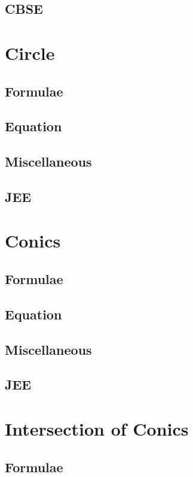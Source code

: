 \documentclass[journal]{IEEEtran}
\begin{document}
\subsection{CBSE}

\newpage
\section{Circle}
\subsection{Formulae}

\subsection{Equation}

\subsection{Miscellaneous}

\subsection{JEE}

\newpage
\section{Conics}
\subsection{Formulae}

\subsection{Equation}

\subsection{Miscellaneous}

\subsection{JEE}
 
\newpage
\section{Intersection of Conics}
\subsection{Formulae}

\end{document}
